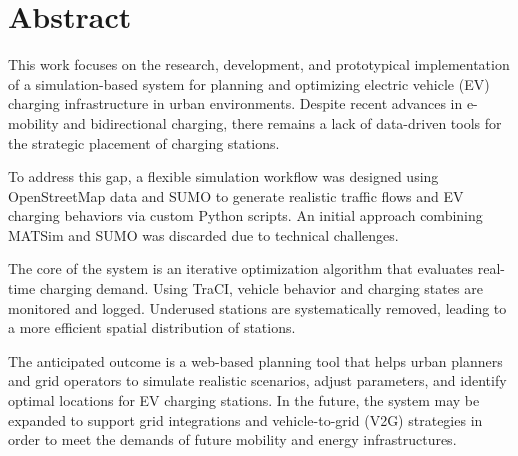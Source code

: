 \thispagestyle{plain}
\section*{Abstract}
This work focuses on the research, development, and prototypical implementation of a simulation-based system for planning and optimizing electric vehicle (EV) charging infrastructure in urban environments. Despite recent advances in e-mobility and bidirectional charging, there remains a lack of data-driven tools for the strategic placement of charging stations.

To address this gap, a flexible simulation workflow was designed using OpenStreetMap data and SUMO to generate realistic traffic flows and EV charging behaviors via custom Python scripts. An initial approach combining MATSim and SUMO was discarded due to technical challenges.

The core of the system is an iterative optimization algorithm that evaluates real-time charging demand. Using TraCI, vehicle behavior and charging states are monitored and logged. Underused stations are systematically removed, leading to a more efficient spatial distribution of stations.

The anticipated outcome is a web-based planning tool that helps urban planners and grid operators to simulate realistic scenarios, adjust parameters, and identify optimal locations for EV charging stations. In the future, the system may be expanded to support grid integrations and vehicle-to-grid (V2G) strategies in order to meet the demands of future mobility and energy infrastructures.